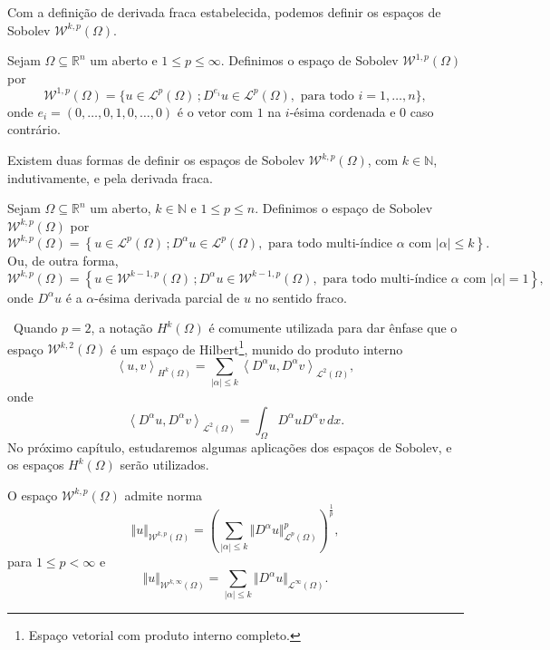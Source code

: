 \documentclass[a4paper, 11pt]{book}
\theoremstyle{definition}
\newcommand{\obs}{\noindent{\textbf{\textcolor{black}{\sffamily Observação:}}}~}
\newcommand{\bN}{\mathbb{N}}
\newcommand{\bR}{\mathbb{R}}
\newcommand{\cL}{\mathcal{L}}
\newcommand{\cW}{\mathcal{W}}
\newcommand{\esssup}{\mathrm{ess\,sup}\,}
\begin{document}
Com a definição de derivada fraca estabelecida, podemos definir os espaços de Sobolev $\cW^{k,p}(\Omega)$.

\begin{dbox}
    Sejam $\Omega \subseteq \bR^n$ um aberto e $1 \leqslant p \leqslant \infty$. 
    Definimos o espaço de Sobolev $\cW^{1,p}(\Omega)$ por
    \[
        \cW^{1,p}(\Omega) = \{u \in \cL^p(\Omega) \,; D^{e_i} u \in \cL^p(\Omega), \text{ para todo } i = 1,\dots,n\},
    \]
    onde $e_i = (0,\dots,0,1,0,\dots,0)$ é o vetor com $1$ na $i$-ésima cordenada e $0$ caso contrário.
\end{dbox}

Existem duas formas de definir os espaços de Sobolev $\cW^{k,p}(\Omega)$, com $k \in \bN$, indutivamente, e pela derivada fraca.

\begin{dbox}
    Sejam $\Omega \subseteq \bR ^n$ um aberto, $k \in \bN$ e $1 \leqslant p \leqslant n$. Definimos o espaço de Sobolev $\cW^{k,p}(\Omega)$ por
    \[
        \cW^{k,p}(\Omega) = \left\{ u \in \cL^p(\Omega) \,; D^\alpha u \in \cL^p(\Omega), \text{ para todo multi-índice } \alpha \text{ com } |\alpha| \leqslant k\right\}.
    \]
    Ou, de outra forma,
    \[
        \cW^{k,p}(\Omega) = \left\{ u \in \cW^{k-1,p}(\Omega) \,; D^\alpha u \in \cW^{k-1,p}(\Omega) , \text{ para todo multi-índice } \alpha \text{ com } |\alpha| = 1\right\},
    \]
    onde $D^\alpha u$ é a $\alpha$-ésima derivada parcial de $u$ no sentido fraco.
\end{dbox}

\obs Quando $p = 2$, a notação $H^{k}(\Omega)$ é comumente utilizada para dar ênfase que o espaço $\cW^{k,2}(\Omega)$ é um espaço de Hilbert\footnote{Espaço vetorial com produto interno completo.}, munido do produto interno
\[
    \left\langle u, v\right\rangle _{H^k(\Omega)} = \sum_{|\alpha| \leqslant k} \left\langle D^\alpha u, D^\alpha v\right\rangle _{\cL^2(\Omega)},
\]
onde
\[
    \left\langle D^\alpha u, D^\alpha v\right\rangle _{\cL^2(\Omega)} = \int_\Omega D^\alpha u D^\alpha v \,dx.
\]
No próximo capítulo, estudaremos algumas aplicações dos espaços de Sobolev, e os espaços $H^k(\Omega)$ serão utilizados.

\begin{dbox}
    O espaço $\cW^{k,p}(\Omega)$ admite norma
    \[
        \Vert u \Vert_{\cW^{k,p}(\Omega)} = \left( \sum_{|\alpha| \leqslant k} \Vert D^\alpha u \Vert_{\cL^p(\Omega)}^p \right)^{\frac{1}{p}},
    \]
    para $1 \leqslant p < \infty$ e 
    \[
        \Vert u \Vert_{\cW^{k,\infty}(\Omega)} 
        = \sum_{|\alpha| \leqslant k} \Vert D^{\alpha}u \Vert_{\cL^\infty(\Omega)}.
    \]
\end{dbox}
\end{document}

